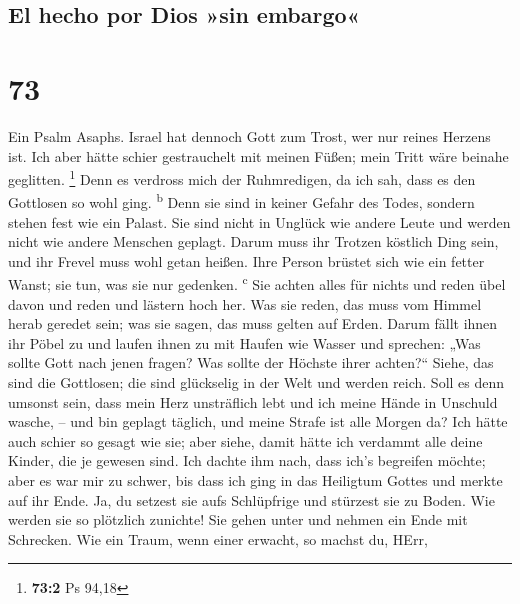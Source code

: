 \hypertarget{el-hecho-por-dios-sin-embargo}{%
\subsection{El hecho por Dios »sin
embargo«}\label{el-hecho-por-dios-sin-embargo}}

\hypertarget{section-72}{%
\section{73}\label{section-72}}

 Ein Psalm Asaphs. Israel hat dennoch Gott zum Trost, wer
nur reines Herzens ist.  Ich aber hätte schier
gestrauchelt mit meinen Füßen; mein Tritt wäre beinahe geglitten.
\footnote{\textbf{73:2} Ps 94,18}  Denn es verdross mich
der Ruhmredigen, da ich sah, dass es den Gottlosen so wohl ging.
\textsuperscript{b}  Denn sie sind in keiner Gefahr des
Todes, sondern stehen fest wie ein Palast.  Sie sind nicht
in Unglück wie andere Leute und werden nicht wie andere Menschen
geplagt.  Darum muss ihr Trotzen köstlich Ding sein, und
ihr Frevel muss wohl getan heißen.  Ihre Person brüstet
sich wie ein fetter Wanst; sie tun, was sie nur gedenken.
\textsuperscript{c}  Sie achten alles für nichts und reden
übel davon und reden und lästern hoch her.  Was sie reden,
das muss vom Himmel herab geredet sein; was sie sagen, das muss gelten
auf Erden.  Darum fällt ihnen ihr Pöbel zu und laufen
ihnen zu mit Haufen wie Wasser  und sprechen: „Was sollte
Gott nach jenen fragen? Was sollte der Höchste ihrer achten?{}``
 Siehe, das sind die Gottlosen; die sind glückselig in
der Welt und werden reich.  Soll es denn umsonst sein,
dass mein Herz unsträflich lebt und ich meine Hände in Unschuld wasche,
--  und bin geplagt täglich, und meine Strafe ist alle
Morgen da?  Ich hätte auch schier so gesagt wie sie; aber
siehe, damit hätte ich verdammt alle deine Kinder, die je gewesen sind.
 Ich dachte ihm nach, dass ich's begreifen möchte; aber
es war mir zu schwer,  bis dass ich ging in das Heiligtum
Gottes und merkte auf ihr Ende.  Ja, du setzest sie aufs
Schlüpfrige und stürzest sie zu Boden.  Wie werden sie so
plötzlich zunichte! Sie gehen unter und nehmen ein Ende mit Schrecken.
 Wie ein Traum, wenn einer erwacht, so machst du, HErr,
